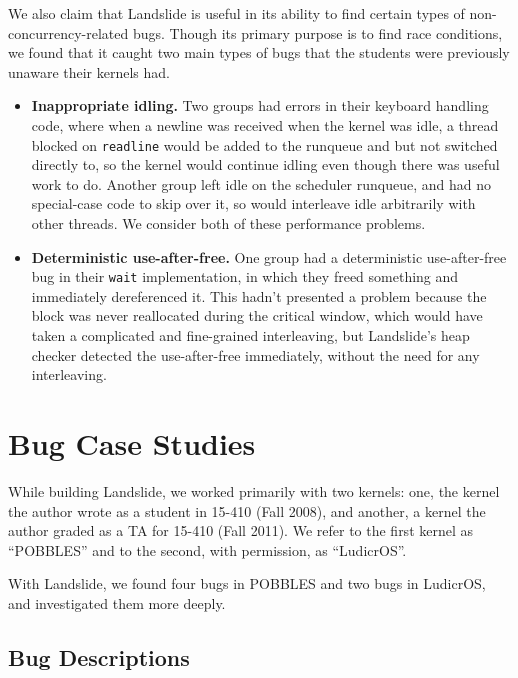 We also claim that Landslide is useful in its ability to find certain types of non-concurrency-related bugs. Though its primary purpose is to find race conditions, we found that it caught two main types of bugs that the students were previously unaware their kernels had.

\begin{itemize}
	\item {\bf Inappropriate idling.} Two groups had errors in their keyboard handling code, where when a newline was received when the kernel was idle, a thread blocked on \texttt{readline} would be added to the runqueue and but not switched directly to, so the kernel would continue idling even though there was useful work to do. Another group left idle on the scheduler runqueue, and had no special-case code to skip over it, so would interleave idle arbitrarily with other threads. We consider both of these performance problems.
	\item {\bf Deterministic use-after-free.} One group had a deterministic use-after-free bug in their \texttt{wait} implementation, in which they freed something and immediately dereferenced it. This hadn't presented a problem because the block was never reallocated during the critical window, which would have taken a complicated and fine-grained interleaving, but Landslide's heap checker detected the use-after-free immediately, without the need for any interleaving.
\end{itemize}

\section{Bug Case Studies}
\label{sec:eval-casestudy}

While building Landslide, we worked primarily with two kernels: one, the kernel the author wrote as a student in 15-410 (Fall 2008), and another, a kernel the author graded as a TA for 15-410 (Fall 2011). We refer to the first kernel as ``POBBLES'' and to the second, with permission, as ``LudicrOS''.

With Landslide, we found four bugs in POBBLES and two bugs in LudicrOS, and investigated them more deeply.

\subsection{Bug Descriptions}

